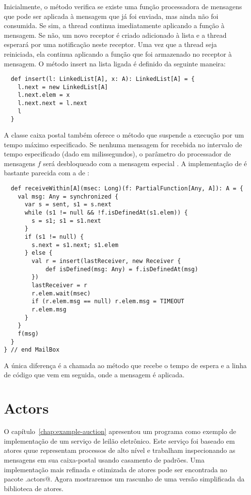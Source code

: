 Inicialmente, o método  verifica se existe uma função 
processadora de mensagens  que pode ser aplicada à mensagem que 
já foi enviada, mas ainda não foi consumida. Se sim, a thread continua
imediatamente aplicando a função  à mensagem. Se não, um novo 
receptor é criado adicionado à lista  e a thread esperará
por uma notificação neste receptor. Uma vez que a thread seja reiniciada,
ela continua aplicando a função  que foi armazenado no receptor à mensagem.
O método insert na lista ligada é definido da seguinte maneira:
\begin{lstlisting}
  def insert(l: LinkedList[A], x: A): LinkedList[A] = {
    l.next = new LinkedList[A]
    l.next.elem = x
    l.next.next = l.next
    l
  }
\end{lstlisting}
A classe caixa postal também oferece o método 
que suspende a execução por um tempo máximo especificado. Se nenhuma
mensagem for recebida no intervalo de tempo especificado (dado em 
milissegundos), o parâmetro do processador de mensagens $f$ será desbloqueado
com a mensagem especial . A implementação de
 é bastante parecida com a de :
\begin{lstlisting}
  def receiveWithin[A](msec: Long)(f: PartialFunction[Any, A]): A = {
    val msg: Any = synchronized {
      var s = sent, s1 = s.next
      while (s1 != null && !f.isDefinedAt(s1.elem)) {
        s = s1; s1 = s1.next 
      }
      if (s1 != null) {
        s.next = s1.next; s1.elem
      } else {
        val r = insert(lastReceiver, new Receiver {
            def isDefined(msg: Any) = f.isDefinedAt(msg)
        })
        lastReceiver = r
        r.elem.wait(msec)
        if (r.elem.msg == null) r.elem.msg = TIMEOUT
        r.elem.msg
      }
    }
    f(msg)
  }
} // end MailBox
\end{lstlisting}
A única diferença é a chamada ao método  que recebe o tempo de espera 
e a linha de código que vem em seguida, onde a mensagem  é aplicada.



\section{Actors}
\label{sec:actors}

O capítulo~\ref{chap:example-auction} apresentou um programa como exemplo de implementação
de um serviço de leilão eletrônico. Este serviço foi baseado em atores quue representam processos 
de alto nível e trabalham inspecionando as mensagens em sua caixa-postal usando casamento de padrões.
Uma implementação mais refinada e otimizada de atores pode ser encontrada no pacote \lstinline@scala.actors@.
Agora mostraremos um rascunho de uma versão simplificada da biblioteca de atores.

